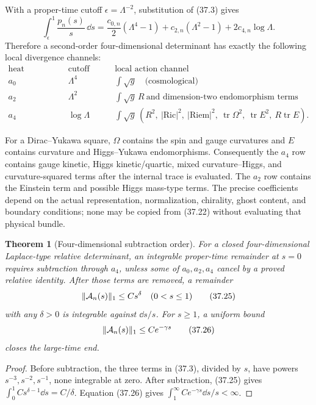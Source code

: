 \documentclass[11pt]{article}
\newtheorem{theorem}{Theorem}[section]
\theoremstyle{remark}
\begin{document}
With a proper-time cutoff \(\epsilon=\Lambda^{-2}\), substitution
of (37.3) gives
\[
 \int_\epsilon^1\frac{p_n(s)}s\,\dd s
 =
 \frac{c_{0,n}}2(\Lambda^4-1)
 +c_{2,n}(\Lambda^2-1)
 +2c_{4,n}\log\Lambda.                                  \tag{37.23}
\]
Therefore a second-order four-dimensional determinant has exactly
the following local divergence channels:
\[
\begin{array}{c|c|c}
\text{heat coefficient}&\text{cutoff order}&
\text{local action channel}\\ \hline
a_0&\Lambda^4&\displaystyle\int\sqrt g
\quad\text{(cosmological)}\\
a_2&\Lambda^2&
\displaystyle\int\sqrt g\,R
\ \text{and dimension-two endomorphism terms}\\
a_4&\log\Lambda&
\displaystyle\int\sqrt g\,
(R^2,\ |\mathrm{Ric}|^2,\ |\mathrm{Riem}|^2,\
\operatorname{tr}\Omega^2,\ \operatorname{tr}E^2,\
R\operatorname{tr}E).
\end{array}                                              \tag{37.24}
\]

For a Dirac--Yukawa square, \(\Omega\) contains the spin and gauge
curvatures and \(E\) contains curvature and Higgs--Yukawa
endomorphisms.  Consequently the \(a_4\) row contains gauge kinetic,
Higgs kinetic/quartic, mixed curvature--Higgs, and curvature-squared
terms after the internal trace is evaluated.  The \(a_2\) row
contains the Einstein term and possible Higgs mass-type terms.  The
precise coefficients depend on the actual representation,
normalization, chirality, ghost content, and boundary conditions;
none may be copied from (37.22) without evaluating that physical
bundle.

\begin{theorem}[Four-dimensional subtraction order]
\label{thm:v15v37-subtraction-order}
For a closed four-dimensional Laplace-type relative determinant,
an integrable proper-time remainder at \(s=0\) requires subtraction
through \(a_4\), unless some of \(a_0,a_2,a_4\) cancel by a proved
relative identity.  After those terms are removed, a remainder
\[
 \|{\cal A}_n(s)\|_1\leq Cs^\delta
 \quad(0<s\leq1)                                        \tag{37.25}
\]
with any \(\delta>0\) is integrable against \(\dd s/s\).
For \(s\geq1\), a uniform bound
\[
 \|{\cal A}_n(s)\|_1\leq Ce^{-\gamma s}                 \tag{37.26}
\]
closes the large-time end.
\end{theorem}

\begin{proof}
Before subtraction, the three terms in (37.3), divided by \(s\),
have powers \(s^{-3},s^{-2},s^{-1}\), none integrable at zero.
After subtraction, (37.25) gives
\(\int_0^1Cs^{\delta-1}\dd s=C/\delta\).
Equation (37.26) gives
\(\int_1^\infty Ce^{-\gamma s}\dd s/s<\infty\).
\end{proof}
\end{document}
